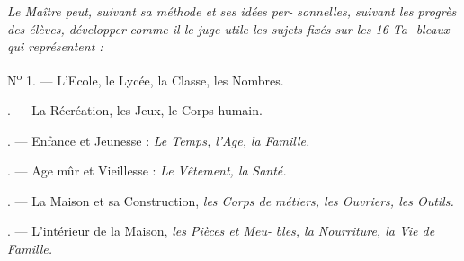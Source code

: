 \begin{VUpage}[111]{}
\VUsaut{2.0mm}
\VUsaut{1.6mm}
\VUsaut{1.0mm}
\VUsaut{4.0mm}

{\fontsize{8.5pt}{10.2pt}\selectfont
\noindent \textit{Le Maître peut, suivant sa méthode et ses idées per-}\nl
\textit{sonnelles, suivant les progrès des élèves, développer}\nl
\textit{comme il le juge utile les sujets fixés sur les 16 Ta-}\nl
\textit{bleaux qui représentent :}

\VUblancAlinea
N\textsuperscript{o} 1. --- L'Ecole, le Lycée, la Classe, les Nombres.

. --- La Récréation, les Jeux, le Corps humain.

. --- Enfance et Jeunesse : \textit{Le Temps, l'Age, la}\nl
\textit{Famille.}

. --- Age mûr et Vieillesse : \textit{Le Vêtement, la}\nl
\textit{Santé.}

. --- La Maison et sa Construction, \textit{les Corps de}\nl
\textit{métiers, les Ouvriers, les Outils.}

. --- L'intérieur de la Maison, \textit{les Pièces et Meu-}\nl
\textit{bles, la Nourriture, la Vie de Famille.}}
\end{VUpage}

